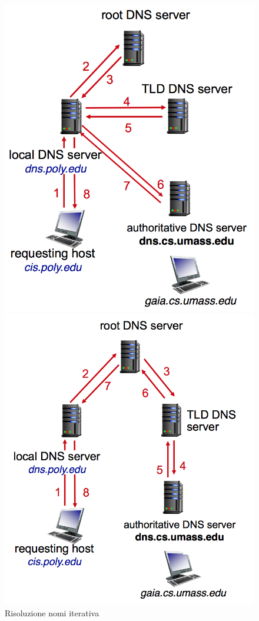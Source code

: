 \documentclass[12pt]{article}
\begin{document}
\begin{figure}[!hbpt]
  \centering
  \begin{minipage}{.45\textwidth}
    \centering
    \includegraphics[width=\linewidth]{images/itedns.png}
    \caption{Risoluzione nomi iterativa}
    \label{fig:itedns}
  \end{minipage}\hfill
  \begin{minipage}{.45\textwidth}
    \centering
    \includegraphics[width=\linewidth]{images/recdns.png}

\end{minipage}
\end{figure}
\end{document}
